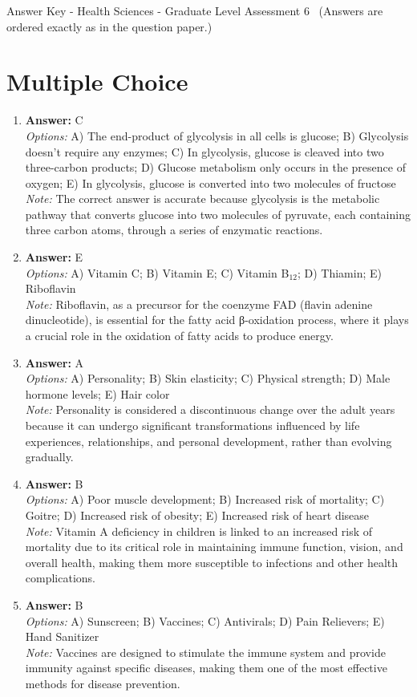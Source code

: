 \documentclass[12pt]{article}
\begin{document}
\begin{center}
Answer Key - Health Sciences - Graduate Level Assessment 6 \
\small (Answers are ordered exactly as in the question paper.)
\end{center}

\section*{Multiple Choice}
\begin{enumerate}[label=\arabic*.]
\item \textbf{Answer:} C
\\ \textit{Options:} A) The end-product of glycolysis in all cells is glucose; B) Glycolysis doesn't require any enzymes; C) In glycolysis, glucose is cleaved into two three-carbon products; D) Glucose metabolism only occurs in the presence of oxygen; E) In glycolysis, glucose is converted into two molecules of fructose
\\ \textit{Note:} The correct answer is accurate because glycolysis is the metabolic pathway that converts glucose into two molecules of pyruvate, each containing three carbon atoms, through a series of enzymatic reactions.
\item \textbf{Answer:} E
\\ \textit{Options:} A) Vitamin C; B) Vitamin E; C) Vitamin B$_{12}$; D) Thiamin; E) Riboflavin
\\ \textit{Note:} Riboflavin, as a precursor for the coenzyme FAD (flavin adenine dinucleotide), is essential for the fatty acid β-oxidation process, where it plays a crucial role in the oxidation of fatty acids to produce energy.
\item \textbf{Answer:} A
\\ \textit{Options:} A) Personality; B) Skin elasticity; C) Physical strength; D) Male hormone levels; E) Hair color
\\ \textit{Note:} Personality is considered a discontinuous change over the adult years because it can undergo significant transformations influenced by life experiences, relationships, and personal development, rather than evolving gradually.
\item \textbf{Answer:} B
\\ \textit{Options:} A) Poor muscle development; B) Increased risk of mortality; C) Goitre; D) Increased risk of obesity; E) Increased risk of heart disease
\\ \textit{Note:} Vitamin A deficiency in children is linked to an increased risk of mortality due to its critical role in maintaining immune function, vision, and overall health, making them more susceptible to infections and other health complications.
\item \textbf{Answer:} B
\\ \textit{Options:} A) Sunscreen; B) Vaccines; C) Antivirals; D) Pain Relievers; E) Hand Sanitizer
\\ \textit{Note:} Vaccines are designed to stimulate the immune system and provide immunity against specific diseases, making them one of the most effective methods for disease prevention.
\end{enumerate}
\end{document}
